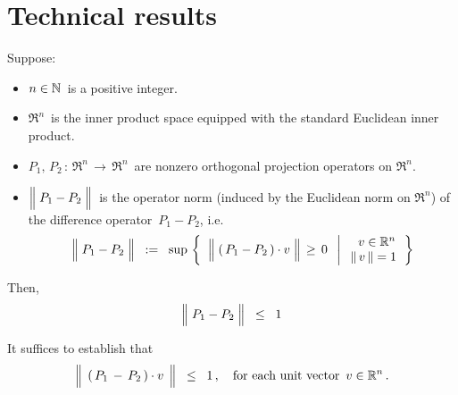 

\section{Technical results}
\setcounter{theorem}{0}
\setcounter{equation}{0}


\renewcommand{\theenumi}{\roman{enumi}}
\renewcommand{\labelenumi}{\textnormal{(\theenumi)}$\;\;$}


\begin{proposition}
\mbox{}\vskip 0.1cm
\noindent
Suppose:
\begin{itemize}
\item
	$n \in \mathbb{N}$\, is a positive integer.
\item
	$\Re^{n}$\, is the inner product space equipped with the standard Euclidean inner product.
\item
	$P_{1}, \, P_{2} \, : \, \Re^{n} \, \longrightarrow \, \Re^{n}$\,
	are nonzero orthogonal projection operators on $\Re^{n}$.
\item
	$\left\Vert\; P_{1} \overset{{\color{white}.}}{-} P_{2} \;\right\Vert$\,
	is the operator norm (induced by the Euclidean norm on $\Re^{n}$)
	of the difference operator \,$P_{1} - P_{2}$, i.e.
	\begin{equation*}
	\left\Vert\; P_{1} \overset{{\color{white}.}}{-} P_{2} \;\right\Vert
	\;\; := \;\;
		\sup\,\left\{\;\;
			\left\Vert\;(\,P_{1} \overset{{\color{white}.}}{-} P_{2}\,) \cdot v \;\right\Vert \,\geq\, 0
			\;\;\left\vert\;
			\begin{array}{c}
				{\color{white}..}v \in \Re^{n} \\ \Vert\,v\,\Vert = 1
				\end{array}
			\right.\right\}
	\end{equation*}
\end{itemize}
Then,
\begin{equation*}
\left\Vert\; P_{1} \overset{{\color{white}.}}{-} P_{2} \;\right\Vert
\;\; \leq \;\;
	1
\end{equation*}
\end{proposition}
\proof
It suffices to establish that
\begin{equation*}
\left\Vert\;\, (\,P_{1} \,\overset{{\color{white}.}}{-}\, P_{2}\,)\cdot v \,\;\right\Vert
\;\; \leq \;\;
	1\,,
\quad
\textnormal{for each unit vector \,$v \in \Re^{n}$}\,.
\end{equation*}
